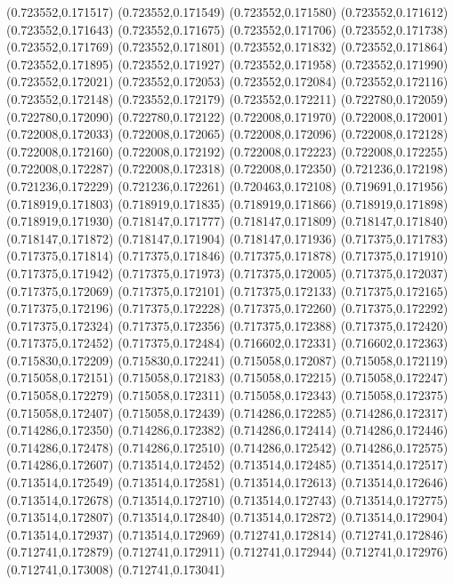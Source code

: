 (0.723552,0.171517)
(0.723552,0.171549)
(0.723552,0.171580)
(0.723552,0.171612)
(0.723552,0.171643)
(0.723552,0.171675)
(0.723552,0.171706)
(0.723552,0.171738)
(0.723552,0.171769)
(0.723552,0.171801)
(0.723552,0.171832)
(0.723552,0.171864)
(0.723552,0.171895)
(0.723552,0.171927)
(0.723552,0.171958)
(0.723552,0.171990)
(0.723552,0.172021)
(0.723552,0.172053)
(0.723552,0.172084)
(0.723552,0.172116)
(0.723552,0.172148)
(0.723552,0.172179)
(0.723552,0.172211)
(0.722780,0.172059)
(0.722780,0.172090)
(0.722780,0.172122)
(0.722008,0.171970)
(0.722008,0.172001)
(0.722008,0.172033)
(0.722008,0.172065)
(0.722008,0.172096)
(0.722008,0.172128)
(0.722008,0.172160)
(0.722008,0.172192)
(0.722008,0.172223)
(0.722008,0.172255)
(0.722008,0.172287)
(0.722008,0.172318)
(0.722008,0.172350)
(0.721236,0.172198)
(0.721236,0.172229)
(0.721236,0.172261)
(0.720463,0.172108)
(0.719691,0.171956)
(0.718919,0.171803)
(0.718919,0.171835)
(0.718919,0.171866)
(0.718919,0.171898)
(0.718919,0.171930)
(0.718147,0.171777)
(0.718147,0.171809)
(0.718147,0.171840)
(0.718147,0.171872)
(0.718147,0.171904)
(0.718147,0.171936)
(0.717375,0.171783)
(0.717375,0.171814)
(0.717375,0.171846)
(0.717375,0.171878)
(0.717375,0.171910)
(0.717375,0.171942)
(0.717375,0.171973)
(0.717375,0.172005)
(0.717375,0.172037)
(0.717375,0.172069)
(0.717375,0.172101)
(0.717375,0.172133)
(0.717375,0.172165)
(0.717375,0.172196)
(0.717375,0.172228)
(0.717375,0.172260)
(0.717375,0.172292)
(0.717375,0.172324)
(0.717375,0.172356)
(0.717375,0.172388)
(0.717375,0.172420)
(0.717375,0.172452)
(0.717375,0.172484)
(0.716602,0.172331)
(0.716602,0.172363)
(0.715830,0.172209)
(0.715830,0.172241)
(0.715058,0.172087)
(0.715058,0.172119)
(0.715058,0.172151)
(0.715058,0.172183)
(0.715058,0.172215)
(0.715058,0.172247)
(0.715058,0.172279)
(0.715058,0.172311)
(0.715058,0.172343)
(0.715058,0.172375)
(0.715058,0.172407)
(0.715058,0.172439)
(0.714286,0.172285)
(0.714286,0.172317)
(0.714286,0.172350)
(0.714286,0.172382)
(0.714286,0.172414)
(0.714286,0.172446)
(0.714286,0.172478)
(0.714286,0.172510)
(0.714286,0.172542)
(0.714286,0.172575)
(0.714286,0.172607)
(0.713514,0.172452)
(0.713514,0.172485)
(0.713514,0.172517)
(0.713514,0.172549)
(0.713514,0.172581)
(0.713514,0.172613)
(0.713514,0.172646)
(0.713514,0.172678)
(0.713514,0.172710)
(0.713514,0.172743)
(0.713514,0.172775)
(0.713514,0.172807)
(0.713514,0.172840)
(0.713514,0.172872)
(0.713514,0.172904)
(0.713514,0.172937)
(0.713514,0.172969)
(0.712741,0.172814)
(0.712741,0.172846)
(0.712741,0.172879)
(0.712741,0.172911)
(0.712741,0.172944)
(0.712741,0.172976)
(0.712741,0.173008)
(0.712741,0.173041)

